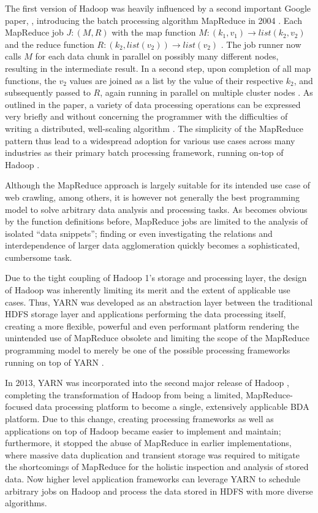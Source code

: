 The first version of Hadoop was heavily influenced by a second important Google paper, \textcite[p.~82]{rajasekar2015survey}, introducing the batch processing algorithm MapReduce in 2004 \autocite{dean2004mapreduce}. Each MapReduce job $J: (M, R)$ with the map function $M: (k_1, v_1) \rightarrow list(k_2, v_2)$ and the reduce function $R: (k_2, list(v_2)) \rightarrow list(v_2)$ \autocite[p.~6]{dean2004mapreduce}. The job runner now calls $M$ for each data chunk in parallel on possibly many different nodes, resulting in the intermediate result. In a second step, upon completion of all map functions, the $v_2$ values are joined as a list by the value of their respective $k_2$, and subsequently passed to $R$, again running in parallel on multiple cluster nodes \autocite[p.~6]{dean2004mapreduce}. As outlined in the paper, a variety of data processing operations can be expressed very briefly and without concerning the programmer with the difficulties of writing a distributed, well-scaling algorithm \autocite[p.~6]{dean2004mapreduce}. The simplicity of the MapReduce pattern thus lead to a widespread adoption for various use cases across many industries as their primary batch processing framework, running on-top of Hadoop \autocite[p.~82]{rajasekar2015survey}.

Although the MapReduce approach is largely suitable for its intended use case of web crawling, among others, it is however not generally the best programming model to solve arbitrary data analysis and processing tasks.
As becomes obvious by the function definitions before, MapReduce jobs are limited to the analysis of isolated \enquote{data snippets}; finding or even investigating the relations and interdependence of larger data agglomeration quickly becomes a sophisticated, cumbersome task.

Due to the tight coupling of Hadoop 1's storage and processing layer, the design of Hadoop was inherently limiting its merit and the extent of applicable use cases. Thus, \ac{YARN} was developed as an abstraction layer between the traditional \ac{HDFS} storage layer and applications performing the data processing itself, creating a more flexible, powerful and even performant platform rendering the unintended use of MapReduce obsolete and limiting the scope of the MapReduce programming model to merely be one of the possible processing frameworks running on top of \ac{YARN} \autocite[p.~6]{vavilapalli2013apache}.

In 2013, \ac{YARN} was incorporated into the second major release of Hadoop \autocite{hadoopreleasenotes}, completing the transformation of Hadoop from being a limited, MapReduce-focused data processing platform to become a single, extensively applicable \ac{BDA} platform. Due to this change, creating processing frameworks as well as applications on top of Hadoop became easier to implement and maintain; furthermore, it stopped the abuse of MapReduce in earlier implementations, where massive data duplication and transient storage was required to mitigate the shortcomings of MapReduce for the holistic inspection and analysis of stored data.
Now higher level application frameworks can leverage \ac{YARN} to schedule arbitrary jobs on Hadoop and process the data stored in \ac{HDFS} with more diverse algorithms.

